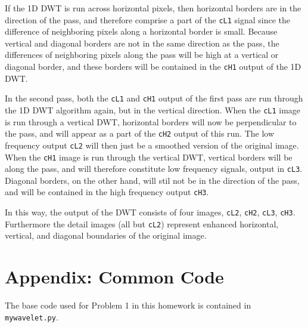 \documentclass[aps,letterpaper,10pt]{article}
\newcommand{\ttt}{\texttt}
\begin{document}
If the 1D DWT is run across horizontal pixels, then horizontal borders are in the direction of the pass, and therefore comprise a part of the \ttt{cL1} signal since the difference of neighboring pixels along a horizontal border is small.  Because vertical and diagonal borders are not in the same direction as the pass, the differences of neighboring pixels along the pass will be high at a vertical or diagonal border, and these borders will be contained in the \ttt{cH1} output of the 1D DWT.

In the second pass, both the \ttt{cL1} and \ttt{cH1} output of the first pass are run through the 1D DWT algorithm again, but in the vertical direction. When the \ttt{cL1} image is run through a vertical DWT, horizontal borders will now be perpendicular to the pass, and will appear as a part of the \ttt{cH2} output of this run.  The low frequency output \ttt{cL2} will then just be a smoothed version of the original image. When the \ttt{cH1} image is run through the vertical DWT, vertical borders will be along the pass, and will therefore constitute low frequency signals, output in \ttt{cL3}. Diagonal borders, on the other hand, will stil not be in the direction of the pass, and will be contained in the high frequency output \ttt{cH3}.

In this way, the output of the DWT consists of four images, \ttt{cL2}, \ttt{cH2}, \ttt{cL3}, \ttt{cH3}. Furthermore the detail images (all but \ttt{cL2}) represent enhanced horizontal, vertical, and diagonal boundaries of the original image.

\section{Appendix: Common Code}
The base code used for Problem 1 in this homework is contained in \ttt{mywavelet.py}.

\end{document}
